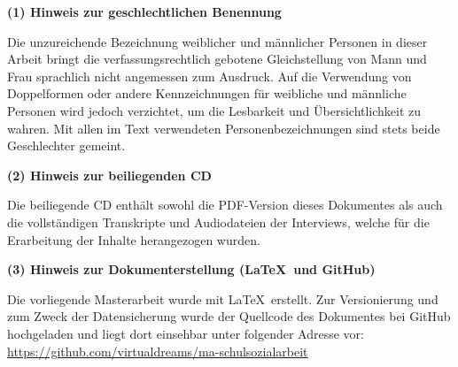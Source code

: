 \vspace*{\fill}

\begin{flushleft}
\textbf{(1) Hinweis zur geschlechtlichen Benennung}
\end{flushleft}
Die unzureichende Bezeichnung weiblicher und männlicher Personen in dieser Arbeit bringt die verfassungsrechtlich gebotene Gleichstellung von Mann und Frau sprachlich nicht angemessen zum Ausdruck. Auf die Verwendung von Doppelformen oder andere Kennzeichnungen für weibliche und männliche Personen wird jedoch verzichtet, um die Lesbarkeit und Übersichtlichkeit zu wahren. Mit allen im Text verwendeten Personenbezeichnungen sind stets beide Geschlechter gemeint.

\begin{flushleft}
\textbf{(2) Hinweis zur beiliegenden CD}
\end{flushleft}
Die beiliegende CD enthält sowohl die PDF-Version dieses Dokumentes als auch die vollständigen Transkripte und Audiodateien der Interviews, welche für die Erarbeitung der Inhalte herangezogen wurden.

\begin{flushleft}
\textbf{(3) Hinweis zur Dokumenterstellung (\LaTeX\ und GitHub)}
\end{flushleft}
Die vorliegende Masterarbeit wurde mit \LaTeX\ erstellt. Zur Versionierung und zum Zweck der Datensicherung wurde der Quellcode des Dokumentes bei GitHub hochgeladen und liegt dort einsehbar unter folgender Adresse vor:\\
\url{https://github.com/virtualdreams/ma-schulsozialarbeit}